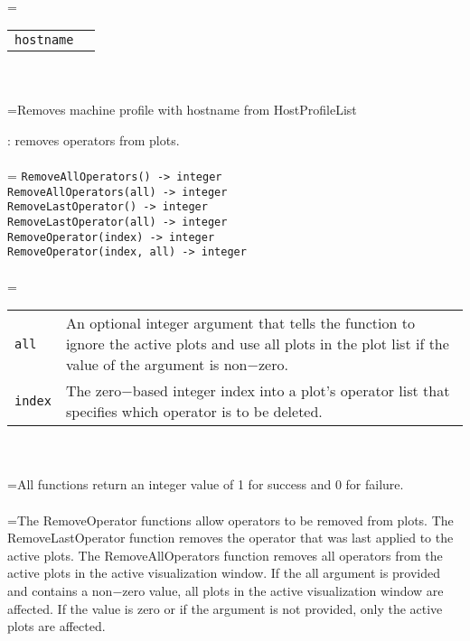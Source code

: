 \documentclass[10pt,a4paper]{report}
\begin{document}
 \\ 
\hangindent=\parindent 
\begin{tabular}{ll}
\verb!hostname! &  \\
\end{tabular} \\[-2mm]


 \\ 
\hangindent=\parindent Removes machine profile with hostname from HostProfileList \\[-3mm] 

\newpage


{}
: removes operators from plots.\\[-3mm]

 \\ 
\hangindent=\parindent 
\verb!RemoveAllOperators() -> integer!\\ 
\verb!RemoveAllOperators(all) -> integer!\\ 
\verb!RemoveLastOperator() -> integer!\\ 
\verb!RemoveLastOperator(all) -> integer!\\ 
\verb!RemoveOperator(index) -> integer!\\ 
\verb!RemoveOperator(index, all) -> integer!\\ [-3mm]

 \\ 
\hangindent=\parindent 
\begin{tabular}{lp{9cm}}
\verb!all! & An optional integer argument that tells the function to ignore the active plots and use all plots in the plot list if the value of the argument is non$-$zero. \\
\verb!index! & The zero$-$based integer index into a plot's operator list that specifies which operator is to be deleted. \\
\end{tabular} \\[-2mm]


 \\ 
\hangindent=\parindent All functions return an integer value of 1 for success and 0 for failure. \\[-3mm] 

 \\ 
\hangindent=\parindent The RemoveOperator functions allow operators to be removed from plots. The RemoveLastOperator function removes the operator that was last applied to the active plots. The RemoveAllOperators function removes all operators from the active plots in the active visualization window. If the all argument is provided and contains a non$-$zero value, all plots in the active visualization window are affected. If the value is zero or if the argument is not provided, only the active plots are affected. \\[-3mm] 
\end{document}

